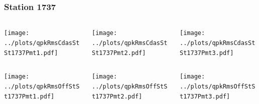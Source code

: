 \documentclass[aspectratio=169]{beamer}
\begin{document}
\begin{frame} 
  \frametitle{Station 1737}
  \begin{center}
    \begin{columns}
      \begin{column}{0.33\textwidth}
        \texttt{[image: ../plots/qpkRmsCdasStSt1737Pmt1.pdf]}
      \end{column}
      \begin{column}{0.33\textwidth}
        \texttt{[image: ../plots/qpkRmsCdasStSt1737Pmt2.pdf]}
      \end{column}
      \begin{column}{0.33\textwidth}
        \texttt{[image: ../plots/qpkRmsCdasStSt1737Pmt3.pdf]}
      \end{column}
    \end{columns}
  \end{center}

  \begin{center}
    \begin{columns}
      \begin{column}{0.33\textwidth}
        \texttt{[image: ../plots/qpkRmsOffStSt1737Pmt1.pdf]}
      \end{column}
      \begin{column}{0.33\textwidth}
        \texttt{[image: ../plots/qpkRmsOffStSt1737Pmt2.pdf]}
      \end{column}
      \begin{column}{0.33\textwidth}
        \texttt{[image: ../plots/qpkRmsOffStSt1737Pmt3.pdf]}
      \end{column}
    \end{columns}
  \end{center}
\end{frame}
\end{document}
